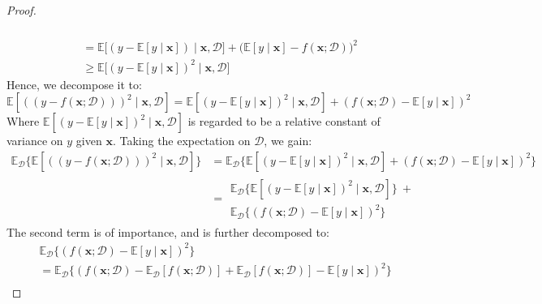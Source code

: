 \documentclass[10pt]{article}
\begin{document}
\begin{proof}
\begin{equation}
\begin{split}
\begin{multlined}
            \end{multlined} \\
            & = \mathbb{E} \Big[(y-\mathbb{E}[y\mid \mathbf{x}])\mid \mathbf{x},\mathcal{D}\Big] + \big(\mathbb{E}[y\mid \mathbf{x}]-f(\mathbf{x};\mathcal{D})\big)^{2}\\
            & \geq \mathbb{E} \big[(y-\mathbb{E}[y\mid \mathbf{x}])^{2}\mid \mathbf{x},\mathcal{D}\big]
        \end{split}
    \end{equation}
    Hence, we decompose it to: 
    \begin{equation}
        \mathbb{E} \left[((y-f(\mathbf{x};\mathcal{D})))^{2}\mid \mathbf{x}, \mathcal{D}\right] = \mathbb{E}\left[(y-\mathbb{E}[y\mid \mathbf{x}])^{2}\mid \mathbf{x},\mathcal{D}\right] + (f(\mathbf{x};\mathcal{D})-\mathbb{E}[y\mid \mathbf{x}])^{2}
    \end{equation}
    Where $\mathbb{E}\left[(y-\mathbb{E}[y\mid \mathbf{x}])^{2}\mid \mathbf{x},\mathcal{D}\right]$ is regarded to be a relative constant of variance on $y$ given $\mathbf{x}$. Taking the expectation on $\mathcal{D}$, we gain: 
    \begin{equation}
        \begin{split}
            \mathbb{E}_{\mathcal{D}} \Big\{ \mathbb{E} \left[((y-f(\mathbf{x};\mathcal{D})))^{2}\mid \mathbf{x}, \mathcal{D}\right]\Big\} & = \mathbb{E}_{\mathcal{D}} \Big\{\mathbb{E}\left[(y-\mathbb{E}[y\mid \mathbf{x}])^{2}\mid \mathbf{x},\mathcal{D}\right] + (f(\mathbf{x};\mathcal{D})-\mathbb{E}[y\mid \mathbf{x}])^{2}\Big\}\\
            & = \begin{multlined}
                \mathbb{E}_{\mathcal{D}} \Big\{ \mathbb{E}\left[(y-\mathbb{E}[y\mid \mathbf{x}])^{2}\mid \mathbf{x},\mathcal{D}\right]\Big\} \: + \\ \mathbb{E}_{\mathcal{D}} \Big\{ (f(\mathbf{x};\mathcal{D})-\mathbb{E}[y\mid \mathbf{x}])^{2}\Big\}
            \end{multlined}
        \end{split}
    \end{equation}
    The second term is of importance, and is further decomposed to: 
    \begin{equation}
        \begin{split}
            & \mathbb{E}_{\mathcal{D}} \Big\{ (f(\mathbf{x};\mathcal{D})-\mathbb{E}[y\mid \mathbf{x}])^{2}\Big\} \\ 
            & = \mathbb{E}_{\mathcal{D}} \Big\{ (f(\mathbf{x};\mathcal{D})- \mathbb{E}_{\mathcal{D}}[f(\mathbf{x};\mathcal{D})] + \mathbb{E}_{\mathcal{D}}[f(\mathbf{x};\mathcal{D})] -\mathbb{E}[y\mid \mathbf{x}])^{2}\Big\} \\

\end{split}
\end{equation}
\end{proof}
\end{document}
